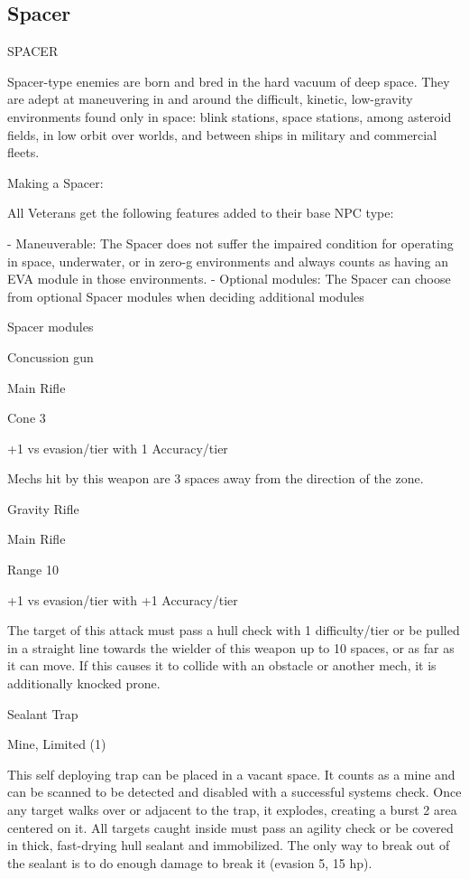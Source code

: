 \subsection{Spacer}
                                                 SPACER  

Spacer-type enemies are born and bred in the hard vacuum of deep space. They are adept at  
maneuvering in and around the difficult, kinetic, low-gravity environments found only in space:  
blink stations, space stations, among asteroid fields, in low orbit over worlds, and between ships  
in military and commercial fleets.     

Making a Spacer:
 
All Veterans get the following features added to their base NPC type:
 
    -    Maneuverable: The Spacer does not suffer the impaired condition for operating in space,  
         underwater, or in zero-g environments and always counts as having an EVA module in  
        those environments.  
    -   Optional modules: The Spacer can choose from optional Spacer modules when  
        deciding additional modules  

Spacer modules
 
Concussion gun
 

                                                                                                           


Main Rifle
 
Cone 3
 
+1 vs evasion/tier with 1 Accuracy/tier
 
Mechs hit by this weapon are 3 spaces away from the direction of the zone.
 

Gravity Rifle
 
Main Rifle
 
Range 10
 
+1 vs evasion/tier with +1 Accuracy/tier
 
The target of this attack must pass a hull check with 1 difficulty/tier or be pulled in a straight line  
towards the wielder of this weapon up to 10 spaces, or as far as it can move. If this causes it to  
collide with an obstacle or another mech, it is additionally knocked prone.
 

Sealant Trap
 
Mine, Limited (1)
 
This self deploying trap can be placed in a vacant space. It counts as a mine and can be  
scanned to be detected and disabled with a successful systems check. Once any target walks  
over or adjacent to the trap, it explodes, creating a burst 2 area centered on it. All targets caught  
inside must pass an agility check or be covered in thick, fast-drying hull sealant and immobilized.  
The only way to break out of the sealant is to do enough damage to break it (evasion 5, 15 hp).
 

